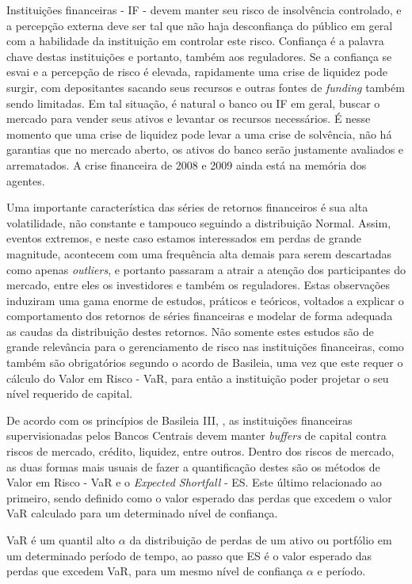 \documentclass[1p]{elsarticle}
\theoremstyle{definition}
\begin{document}
Instituições financeiras - IF - devem manter seu risco de insolvência controlado, e a percepção externa deve ser tal que não haja desconfiança do público em geral com a habilidade da instituição em controlar este risco. Confiança é a palavra chave destas instituições e portanto, também aos reguladores. Se a confiança se esvai e a percepção de risco é elevada, rapidamente uma crise de liquidez pode surgir, com depositantes sacando seus recursos e outras fontes de \emph{funding} também sendo limitadas. Em tal situação, é natural o banco ou IF em geral, buscar o mercado para vender seus ativos e levantar os recursos necessários. É nesse momento que uma crise de liquidez pode levar a uma crise de solvência, não há garantias que no mercado aberto, os ativos do banco serão justamente avaliados e arrematados. A crise financeira de 2008 e 2009 ainda está na memória dos agentes.

Uma importante característica das séries de retornos financeiros é sua alta volatilidade, não constante e tampouco seguindo a distribuição Normal. Assim, eventos extremos, e neste caso estamos interessados em perdas de grande magnitude, acontecem com uma frequência alta demais para serem descartadas como apenas \emph{outliers}, e portanto passaram a atrair a atenção dos participantes do mercado, entre eles os investidores e também os reguladores. Estas observações induziram uma gama enorme de estudos, práticos e teóricos, voltados a explicar o comportamento dos retornos de séries financeiras e modelar de forma adequada as caudas da distribuição destes retornos. Não somente estes estudos são de grande relevância para o gerenciamento de risco nas instituições financeiras, como também são obrigatórios segundo o acordo de Basileia, uma vez que este requer o cálculo do Valor em Risco - VaR, para então a instituição poder projetar o seu nível requerido de capital. 

De acordo com os princípios de Basileia III, \cite{BankingSupervision2011, BankingSupervision2013, BankingSupervision2014}, as instituições financeiras supervisionadas pelos Bancos Centrais devem manter \emph{buffers} de capital contra riscos de mercado, crédito, liquidez, entre outros. Dentro dos riscos de mercado, as duas formas mais usuais de fazer a quantificação destes são os métodos de Valor em Risco - VaR e o \emph{Expected Shortfall} - ES. Este último relacionado ao primeiro, sendo definido como o valor esperado das perdas que excedem o valor VaR calculado para um determinado nível de confiança.

VaR é um quantil alto $\alpha$ da distribuição de perdas de um ativo ou portfólio em um determinado período de tempo, ao passo que ES é o valor esperado das perdas que excedem VaR, para um mesmo nível de confiança $\alpha$ e período.
\end{document}
